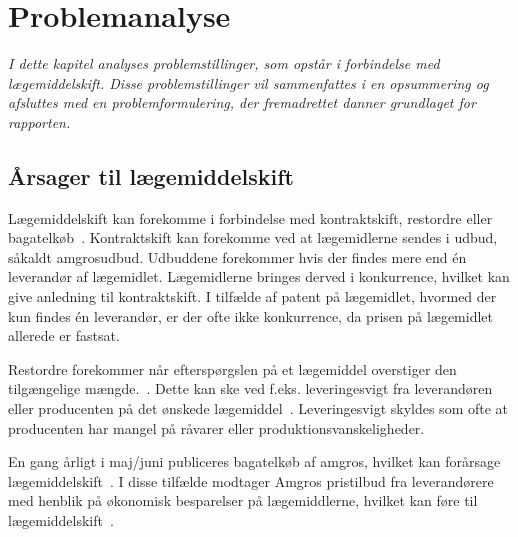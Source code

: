 \chapter{Problemanalyse}
\textit{I dette kapitel analyses problemstillinger, som opstår i forbindelse med lægemiddelskift. Disse problemstillinger vil sammenfattes i en opsummering og afsluttes med en problemformulering, der fremadrettet danner  grundlaget for rapporten.}

\section{Årsager til lægemiddelskift}
Lægemiddelskift kan forekomme i forbindelse med kontraktskift, restordre eller bagatelkøb~\citep{Amgros2015}. Kontraktskift kan forekomme ved at lægemidlerne sendes i udbud, såkaldt amgrosudbud. Udbuddene forekommer hvis der findes mere end én leverandør af lægemidlet. Lægemidlerne bringes derved i konkurrence, hvilket kan give anledning til kontraktskift. I tilfælde af patent på lægemidlet, hvormed der kun findes én leverandør, er der ofte ikke konkurrence, da prisen på lægemidlet allerede er fastsat.~\citep{Amgros2015} 

Restordre forekommer når efterspørgslen på et lægemiddel overstiger den tilgængelige mængde.~\citep{Amgros2015}. Dette kan ske ved f.eks. leveringesvigt fra leverandøren eller producenten på det ønskede lægemiddel~\citep{Amgros2017, Laegemiddelinformaion2017}. Leveringesvigt skyldes som ofte at producenten har mangel på råvarer eller produktionsvanskeligheder.~\citep{Amgros2017, Laegemiddelinformaion2017} 

 
En gang årligt i maj/juni publiceres bagatelkøb af amgros, hvilket kan forårsage lægemiddelskift~\citep{Amgros2018}. I disse tilfælde modtager Amgros pristilbud fra leverandørere med henblik på økonomisk besparelser på lægemiddlerne, hvilket kan føre til lægemiddelskift~\citep{Amgros2012}. 


